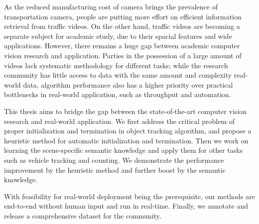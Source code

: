 \summary

As the reduced manufacturing cost of camera brings the prevalence of transportation camera, people are putting more effort on efficient information retrieval from traffic videos.
On the other hand, traffic videos are becoming a separate subject for academic study, due to their spacial features and wide applications.
However, there remains a huge gap between academic computer vision research and application. 
Parties in the possession of a large amount of videos lack systematic methodology for different tasks;
while the research community has little access to data with the same amount and complexity real-world data, algorithm performance also has a higher priority over practical bottlenecks in real-world application, such as throughput and automation.

This thesis aims to bridge the gap between the state-of-the-art computer vision research and real-world application.
We first address the critical problem of proper initialization and termination in object tracking algorithm, and propose a heuristic method for automatic initialization and termination.
Then we work on learning the scene-specific semantic knowledge and apply them for other tasks such as vehicle tracking and counting.
We demonstrate the performance improvement by the heuristic method and further boost by the semantic knowledge.

With feasibility for real-world deployment being the prerequisite, our methods are end-to-end without human input and run in real-time. 
Finally, we annotate and release a comprehensive dataset for the community. 